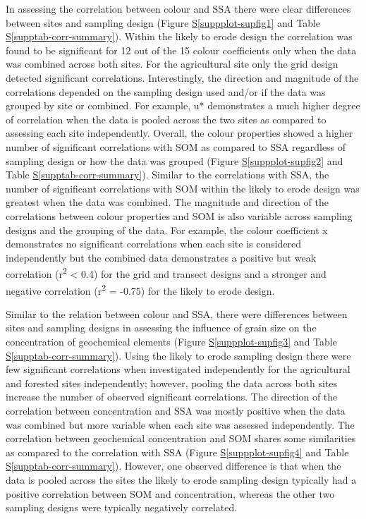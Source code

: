\documentclass[
  number]{elsarticle}
\newcommand*\quartosuppplotref[1]{Figure \hyperref[#1]{S\ref{#1}}}
\newcommand*\quartosupptabref[1]{Table \hyperref[#1]{S\ref{#1}}}
\begin{document}
In assessing the correlation between colour and SSA there were clear
differences between sites and sampling design
(\quartosuppplotref{suppplot-supfig1} and
\quartosupptabref{supptab-corr-summary}). Within the likely to erode
design the correlation was found to be significant for 12 out of the 15
colour coefficients only when the data was combined across both sites.
For the agricultural site only the grid design detected significant
correlations. Interestingly, the direction and magnitude of the
correlations depended on the sampling design used and/or if the data was
grouped by site or combined. For example, u* demonstrates a much higher
degree of correlation when the data is pooled across the two sites as
compared to assessing each site independently. Overall, the colour
properties showed a higher number of significant correlations with SOM
as compared to SSA regardless of sampling design or how the data was
grouped (\quartosuppplotref{suppplot-supfig2} and
\quartosupptabref{supptab-corr-summary}). Similar to the correlations
with SSA, the number of significant correlations with SOM within the
likely to erode design was greatest when the data was combined. The
magnitude and direction of the correlations between colour properties
and SOM is also variable across sampling designs and the grouping of the
data. For example, the colour coefficient x demonstrates no significant
correlations when each site is considered independently but the combined
data demonstrates a positive but weak correlation (r\textsuperscript{2}
\textless{} 0.4) for the grid and transect designs and a stronger and
negative correlation (r\textsuperscript{2} = -0.75) for the likely to
erode design.

Similar to the relation between colour and SSA, there were differences
between sites and sampling designs in assessing the influence of grain
size on the concentration of geochemical elements
(\quartosuppplotref{suppplot-supfig3} and
\quartosupptabref{supptab-corr-summary}). Using the likely to erode
sampling design there were few significant correlations when
investigated independently for the agricultural and forested sites
independently; however, pooling the data across both sites increase the
number of observed significant correlations. The direction of the
correlation between concentration and SSA was mostly positive when the
data was combined but more variable when each site was assessed
independently. The correlation between geochemical concentration and SOM
shares some similarities as compared to the correlation with SSA
(\quartosuppplotref{suppplot-supfig4} and
\quartosupptabref{supptab-corr-summary}). However, one observed
difference is that when the data is pooled across the sites the likely
to erode sampling design typically had a positive correlation between
SOM and concentration, whereas the other two sampling designs were
typically negatively correlated.
\end{document}
